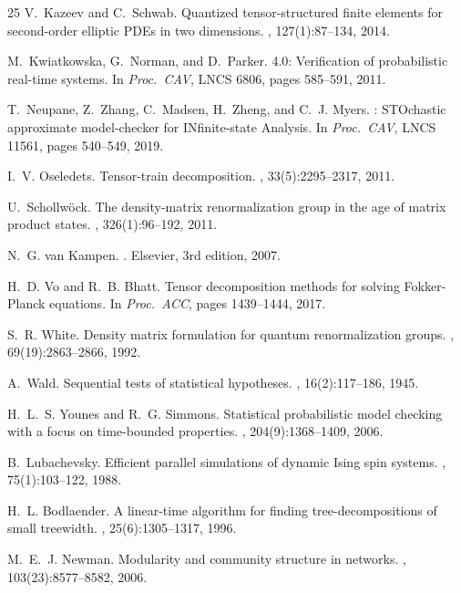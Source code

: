 \documentclass[11pt]{article}
\begin{document}
\begin{thebibliography}{25}
V.~Kazeev and C.~Schwab.
\newblock Quantized tensor-structured finite elements for second-order
  elliptic {PDE}s in two dimensions.
, 127(1):87--134, 2014.

M.~Kwiatkowska, G.~Norman, and D.~Parker.
 4.0: Verification of probabilistic real-time systems.
\newblock In {\em Proc.\ CAV}, LNCS 6806, pages 585--591, 2011.

T.~Neupane, Z.~Zhang, C.~Madsen, H.~Zheng, and C.~J. Myers.
: {STO}chastic approximate model-checker for
  {IN}finite-state {A}nalysis.
\newblock In {\em Proc.\ CAV}, LNCS 11561, pages 540--549, 2019.

I.~V. Oseledets.
\newblock Tensor-train decomposition.
, 33(5):2295--2317, 2011.

U.~Schollw{\"o}ck.
\newblock The density-matrix renormalization group in the age of matrix
  product states.
, 326(1):96--192, 2011.

N.~G. van Kampen.
.
\newblock Elsevier, 3rd edition, 2007.

H.~D. Vo and R.~B. Bhatt.
\newblock Tensor decomposition methods for solving {F}okker-{P}lanck
  equations.
\newblock In {\em Proc.\ ACC}, pages 1439--1444, 2017.

S.~R. White.
\newblock Density matrix formulation for quantum renormalization groups.
, 69(19):2863--2866, 1992.

A.~Wald.
\newblock Sequential tests of statistical hypotheses.
, 16(2):117--186, 1945.

H.~L.~S. Younes and R.~G. Simmons.
\newblock Statistical probabilistic model checking with a focus on
  time-bounded properties.
, 204(9):1368--1409, 2006.

B.~Lubachevsky.
\newblock Efficient parallel simulations of dynamic {I}sing spin systems.
, 75(1):103--122, 1988.

H.~L. Bodlaender.
\newblock A linear-time algorithm for finding tree-decompositions of small
  treewidth.
, 25(6):1305--1317, 1996.

M.~E.~J. Newman.
\newblock Modularity and community structure in networks.
,
  103(23):8577--8582, 2006.

\end{thebibliography}
\end{document}

